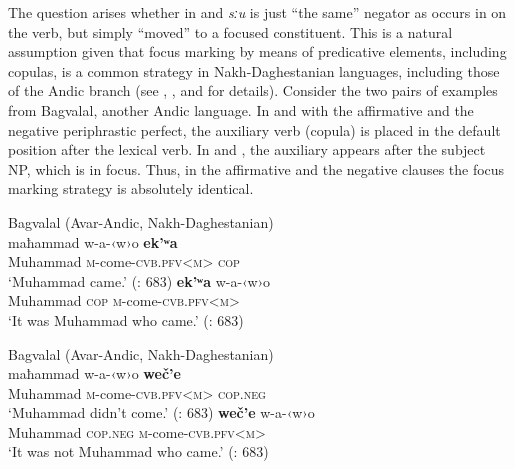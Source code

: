\documentclass[output=paper,colorlinks=true, citecolor=brown]{langscibook}
\begin{document}
The question arises whether in  and  \textit{sːu} is just “the same” negator as occurs in  on the verb, but simply “moved” to a focused constituent. This is a natural assumption given that focus marking by means of predicative elements, including copulas, is a common strategy in Nakh-Daghestanian languages, including those of the Andic branch (see \citealt{Kazenin2003}, \citealt{KalininaSumbatova2007}, \citealt{Semënova2014} and \citealt{Maisak2023} for details). Consider the two pairs of examples from Bagvalal, another Andic language. In  and  with the affirmative and the negative periphrastic perfect, the auxiliary verb (copula) is placed in the default position after the lexical verb. In  and , the auxiliary appears after the subject NP, which is in focus. Thus, in the affirmative and the negative clauses the focus marking strategy is absolutely identical. 

\ea\label{ex:and:64} Bagvalal (Avar-Andic, Nakh-Daghestanian) \\
    \ea\label{ex:and:64a}
        \gll  maħammad w-a-‹w›o \textbf{ek’ʷa}\\ 
               Muhammad \textsc{m}{}-come-\textsc{cvb.pfv<m}> \textsc{cop} \\
        \glt ‘Muhammad came.’ (\citealt{KibrikEtAl2001}: 683)
    \ex\label{ex:and:64b} %
        \gll   [maħammad] \textbf{ek’ʷa} w-a-‹w›o\\
               {\db}Muhammad \textsc{cop} \textsc{m}{}-come-\textsc{cvb.pfv<m}> \\
        \glt ‘It was Muhammad who came.’ (\citealt{KibrikEtAl2001}: 683)
    \z
\z 

\ea\label{ex:and:65} Bagvalal (Avar-Andic, Nakh-Daghestanian) \\
    \ea\label{ex:and:65a}
        \gll  maħammad w-a-‹w›o \textbf{weč’e}\\ 
               Muhammad \textsc{m}{}-come-\textsc{cvb.pfv<m}> \textsc{cop.neg} \\
        \glt ‘Muhammad didn’t come.’ (\citealt{KibrikEtAl2001}: 683)
    \ex\label{ex:and:65b} %
        \gll  [maħammad] \textbf{weč’e} w-a-‹w›o\\
               {\db}Muhammad \textsc{cop.neg} \textsc{m}{}-come-\textsc{cvb.pfv<m}> \\
        \glt ‘It was not Muhammad who came.’ (\citealt{KibrikEtAl2001}: 683)
    \z
\z 
\end{document}
